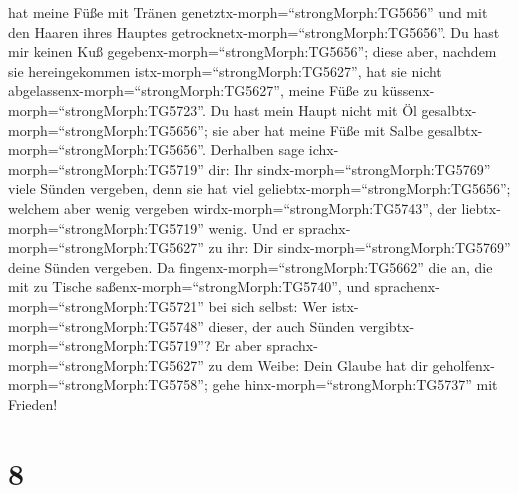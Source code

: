 hat meine Füße mit Tränen genetztx-morph=``strongMorph:TG5656'' und mit
den Haaren ihres Hauptes getrocknetx-morph=``strongMorph:TG5656''.
 Du hast mir keinen Kuß
gegebenx-morph=``strongMorph:TG5656''; diese aber, nachdem sie
hereingekommen istx-morph=``strongMorph:TG5627'', hat sie nicht
abgelassenx-morph=``strongMorph:TG5627'', meine Füße zu
küssenx-morph=``strongMorph:TG5723''.  Du hast mein Haupt
nicht mit Öl gesalbtx-morph=``strongMorph:TG5656''; sie aber hat meine
Füße mit Salbe gesalbtx-morph=``strongMorph:TG5656''. 
Derhalben sage ichx-morph=``strongMorph:TG5719'' dir: Ihr
sindx-morph=``strongMorph:TG5769'' viele Sünden vergeben, denn sie hat
viel geliebtx-morph=``strongMorph:TG5656''; welchem aber wenig vergeben
wirdx-morph=``strongMorph:TG5743'', der
liebtx-morph=``strongMorph:TG5719'' wenig.  Und er
sprachx-morph=``strongMorph:TG5627'' zu ihr: Dir
sindx-morph=``strongMorph:TG5769'' deine Sünden vergeben. 
Da fingenx-morph=``strongMorph:TG5662'' die an, die mit zu Tische
saßenx-morph=``strongMorph:TG5740'', und
sprachenx-morph=``strongMorph:TG5721'' bei sich selbst: Wer
istx-morph=``strongMorph:TG5748'' dieser, der auch Sünden
vergibtx-morph=``strongMorph:TG5719''?  Er aber
sprachx-morph=``strongMorph:TG5627'' zu dem Weibe: Dein Glaube hat dir
geholfenx-morph=``strongMorph:TG5758''; gehe
hinx-morph=``strongMorph:TG5737'' mit Frieden!

\hypertarget{section-7}{%
\section{8}\label{section-7}}

